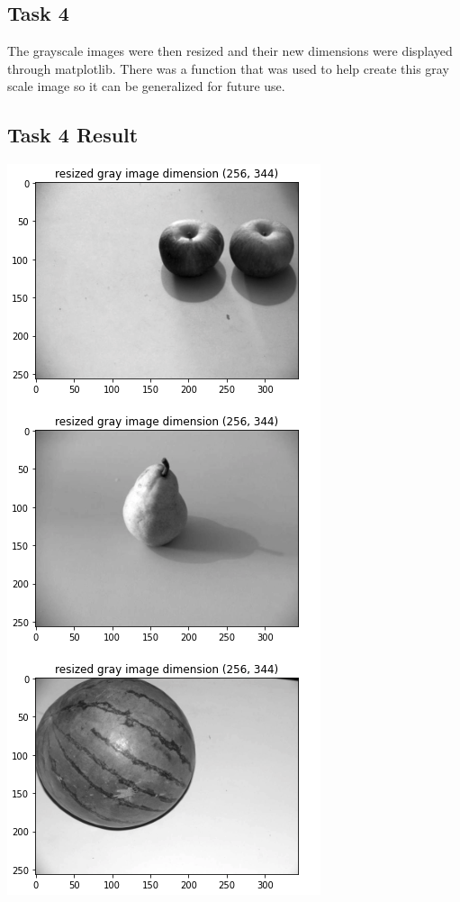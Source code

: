 \documentclass{article}
\begin{document}
\begin{multicols}{2}
	\section{Task 4}
	The grayscale images were then resized and their new dimensions were displayed through matplotlib. There was a function that was used to help create this gray scale image so it can be generalized for future use.	
	\subsection{Task 4 Result}
	\pagebreak
	\centering
	\includegraphics[scale=0.25]{../screenshots/gray_resized.png}
\end{multicols}
\end{document}

